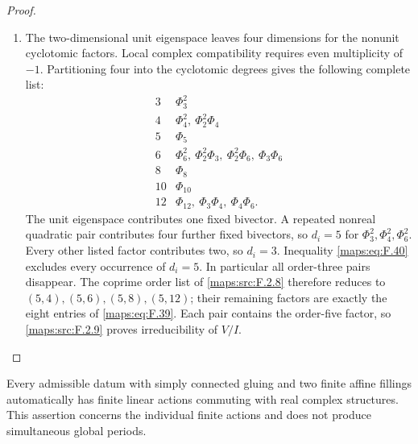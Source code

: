 \begin{proof}
\begin{enumerate}[label={$\langle1\rangle$\arabic*.}]
\item The two-dimensional unit eigenspace leaves four dimensions
for the nonunit cyclotomic factors.  Local complex compatibility
requires even multiplicity of $-1$.  Partitioning four into the
cyclotomic degrees gives the following complete list:
\[
\begin{array}{c|l}
3&\Phi_3^2\\
4&\Phi_4^2,\ \Phi_2^2\Phi_4\\
5&\Phi_5\\
6&\Phi_6^2,\ \Phi_2^2\Phi_3,\ \Phi_2^2\Phi_6,\ \Phi_3\Phi_6\\
8&\Phi_8\\
10&\Phi_{10}\\
12&\Phi_{12},\ \Phi_3\Phi_4,\ \Phi_4\Phi_6.
\end{array}
\]
The unit eigenspace contributes one fixed bivector.  A repeated
nonreal quadratic pair contributes four further fixed bivectors,
so $d_i=5$ for $\Phi_3^2,\Phi_4^2,\Phi_6^2$.
Every other listed factor contributes two, so $d_i=3$.
Inequality \eqref{maps:eq:F.40} excludes every occurrence of
$d_i=5$.  In particular all order-three pairs disappear.
The coprime order list of \cref{maps:src:F.2.8} therefore reduces
to $(5,4),(5,6),(5,8),(5,12)$; their remaining factors are exactly
the eight entries of \eqref{maps:eq:F.39}.
Each pair contains the order-five factor, so
\cref{maps:src:F.2.9} proves irreducibility of $V/I$.
\end{enumerate}
\end{proof}




\begin{proposition}\hypertarget{tag-02N4}{}\label{maps:src:F.2.15}


Every admissible datum with simply connected gluing and two finite affine fillings automatically has finite linear actions commuting
with real complex structures.  This assertion concerns the
individual finite actions and does not produce simultaneous
global periods.

\end{proposition}


